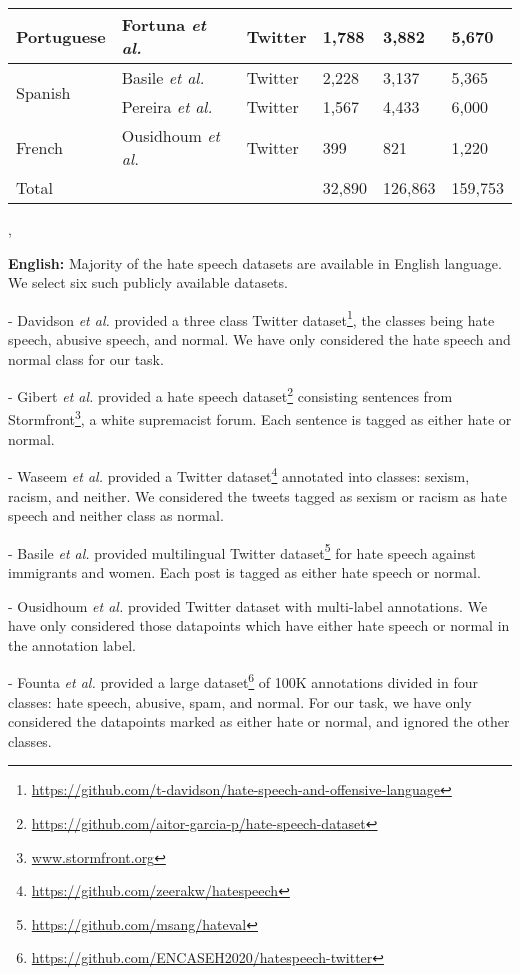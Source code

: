 \documentclass[runningheads]{llncs}
\begin{document}
\begin{table}[!htb]
\begin{tabular}{llllll}
\multirow{1}{*}{Portuguese} &Fortuna \textit{et al.}~\cite{fortuna2019hierarchically}& Twitter & 1,788    &    3,882   &   5,670 \\\hline
\multirow{2}{*}{Spanish} &Basile \textit{et al.}~\cite{basile2019semeval}&   Twitter &   2,228  &  3,137   & 5,365 \\
         &Pereira \textit{et al.}~\cite{pereira2019detecting} &   Twitter &   1,567   &  4,433   & 6,000 \\\hline
\multirow{1}{*}{French} &Ousidhoum \textit{et al.}~\cite{ousidhoum2019multilingual}&    Twitter &   399 &   821 &  1,220 \\\hline
Total & & &32,890 & 126,863 & 159,753\\\hline
\end{tabular}

, 
\end{table}
\noindent\textbf{English:} Majority of the hate speech datasets are available in English language. We select six such publicly available datasets.
\begin{compactenum}
    \item [-] Davidson \textit{et al.} \cite{davidson2017automated} provided a three class Twitter dataset\footnote{\url{https://github.com/t-davidson/hate-speech-and-offensive-language}}, the classes being hate speech, abusive speech, and normal. We have only considered the hate speech and normal class for our task.
    \item [-] Gibert \textit{et al.} \cite{de2018hate} provided a hate speech dataset\footnote{\url{https://github.com/aitor-garcia-p/hate-speech-dataset}} consisting sentences from Stormfront\footnote{\url{www.stormfront.org}}, a white supremacist forum. Each sentence is tagged as either hate or normal.
    \item [-] Waseem \textit{et al.} \cite{waseem2016hateful} provided a Twitter dataset\footnote{\url{https://github.com/zeerakw/hatespeech}} annotated into classes: sexism, racism, and neither. We considered the tweets tagged as sexism or racism as hate speech and neither class as normal.
    \item [-] Basile \textit{et al.} \cite{basile2019semeval} provided multilingual Twitter dataset\footnote{\url{https://github.com/msang/hateval}\label{link:basile}} for hate speech against immigrants and women. Each post is tagged as either hate speech or normal.
    \item [-] Ousidhoum \textit{et al.} \cite{ousidhoum2019multilingual} provided Twitter dataset with multi-label annotations. We have only considered those datapoints which have either hate speech or normal in the annotation label.
    \item [-] Founta \textit{et al.} \cite{founta2018large} provided a large dataset\footnote{\url{https://github.com/ENCASEH2020/hatespeech-twitter}} of 100K annotations divided in four classes: hate speech, abusive, spam, and normal. For our task, we have only considered the datapoints marked as either hate or normal, and ignored the other classes.
\end{compactenum}
\end{document}
